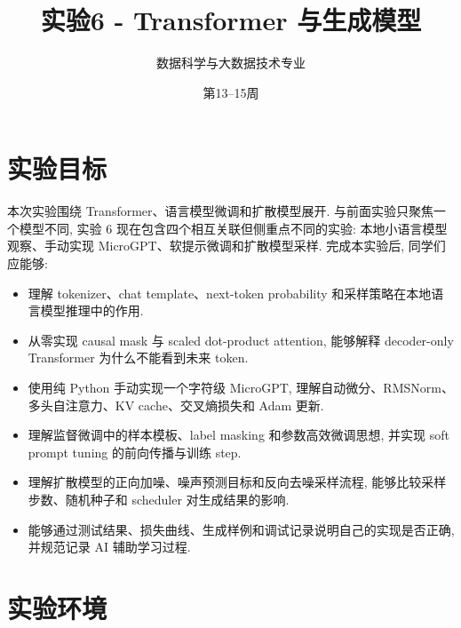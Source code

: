 \documentclass{../../nndlcourse}
\begin{document}
\title{实验6 - Transformer 与生成模型}
\author{数据科学与大数据技术专业}
\date{第13--15周}
\maketitle


\section{实验目标}

本次实验围绕 Transformer、语言模型微调和扩散模型展开. 与前面实验只聚焦一个模型不同, 实验 6 现在包含四个相互关联但侧重点不同的实验: 本地小语言模型观察、手动实现 MicroGPT、软提示微调和扩散模型采样. 完成本实验后, 同学们应能够:

\begin{itemize}
    \item 理解 tokenizer、chat template、next-token probability 和采样策略在本地语言模型推理中的作用.
    \item 从零实现 causal mask 与 scaled dot-product attention, 能够解释 decoder-only Transformer 为什么不能看到未来 token.
    \item 使用纯 Python 手动实现一个字符级 MicroGPT, 理解自动微分、RMSNorm、多头自注意力、KV cache、交叉熵损失和 Adam 更新.
    \item 理解监督微调中的样本模板、label masking 和参数高效微调思想, 并实现 soft prompt tuning 的前向传播与训练 step.
    \item 理解扩散模型的正向加噪、噪声预测目标和反向去噪采样流程, 能够比较采样步数、随机种子和 scheduler 对生成结果的影响.
    \item 能够通过测试结果、损失曲线、生成样例和调试记录说明自己的实现是否正确, 并规范记录 AI 辅助学习过程.
\end{itemize}


\section{实验环境}
\end{document}
